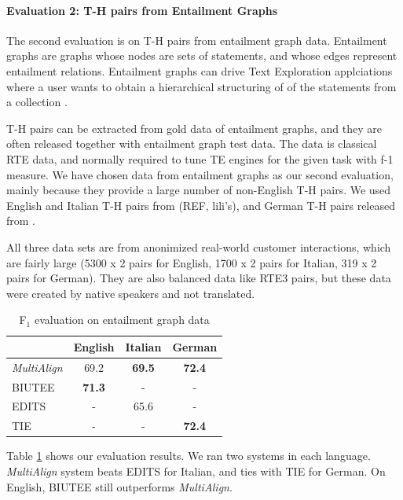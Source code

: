 \documentclass[11pt,letterpaper]{article}
\begin{document}
\paragraph{Evaluation 2: T-H pairs from Entailment Graphs} The second 
evaluation is on T-H pairs from entailment graph data. Entailment
graphs are graphs whose nodes are sets of statements, and whose edges
represent entailment relations. Entailment graphs can drive Text
Exploration applciations where a user wants to obtain a hierarchical
structuring of of the statements from a 
collection \cite{berant2012learning}.   

T-H pairs can be extracted from gold data of entailment graphs, and
they are often released together with entailment graph test data. The
data is classical RTE data, and normally required to tune TE engines
for the given task with f-1 measure. We have chosen data from
entailment graphs as our second evaluation, mainly because they
provide a large number of non-English T-H pairs. We used English and
Italian T-H pairs from (REF, lili's), and German T-H pairs released
from \cite{Eichler:2014}.     

All three data sets are from anonimized real-world customer
interactions, which are fairly large (5300 x 2 pairs for English, 1700
x 2 pairs for Italian, 319 x 2 pairs for German). They are also
balanced data like RTE3 pairs, but these data were created by native 
speakers and not translated. 

\begin{table}[t!]
\centering
\small
\begin{tabular}{l|ccc}
              &   English    &   Italian   &  German  \\
\hline
{\em MultiAlign}&   69.2     &   \textbf{69.5}    &   \textbf{72.4}  \\
BIUTEE        &   \textbf{71.3}     &     -       &     -     \\
EDITS         &      -       &   65.6    &     -     \\
TIE           &      -       &     -       &   \textbf{72.4}  \\ 
\end{tabular}
\caption{F$_1$ evaluation on entailment graph data}
\label{table:egraph}
\end{table}

Table \ref{table:egraph} shows our evaluation results. We ran two
systems in each language. {\it MultiAlign} system beats EDITS for
Italian, and ties with TIE for German. On English, BIUTEE still
outperforms {\it MultiAlign}.
\end{document}
